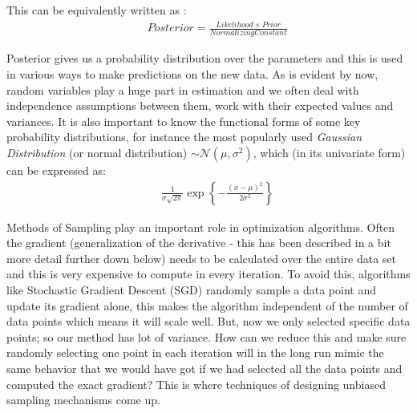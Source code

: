 \documentclass[a4paper]{article}
\begin{document}
\noindent This can be equivalently written as : \\
\begin{equation} \label{eq:3}
\begin{aligned}
& & Posterior = \frac{ Likelihood \times Prior}{Normalizing Constant}
\end{aligned}
\end{equation}

\noindent Posterior gives us a probability distribution over the parameters and this is used in various ways to make predictions on the new data. As is evident by now, random variables play a huge part in estimation and we often deal with independence assumptions between them, work with their expected values and variances. It is also important to know the functional forms of some key probability distributions, for instance the most popularly used {\it Gaussian Distribution} (or normal distribution) $\sim \mathcal{N} (\mu, \sigma^2)$, which (in its univariate form) can be expressed as: \\

\begin{equation} \label{eq:4}
\begin{aligned}
& & \frac{1}{\sigma \sqrt{2 \pi}} \exp \left\{ - \frac{(x-\mu)^2}{2 \sigma^2} \right\}
\end{aligned}
\end{equation}

\noindent Methods of Sampling play an important role in optimization algorithms. Often the gradient (generalization of the derivative - this has been described in a bit more detail further down below) needs to be calculated over the entire data set and this is very expensive to compute in every iteration. To avoid this, algorithms like Stochastic Gradient Descent (SGD) randomly sample a data point and update its gradient alone, this makes the algorithm independent of the number of data points which means it will scale well. But, now we only selected specific data points; so our method has lot of variance. How can we reduce this and make sure randomly selecting one point in each iteration will in the long run mimic the same behavior that we would have got if we had selected all the data points and computed the exact gradient? This is where techniques of designing unbiased sampling mechanisms come up. \\
\end{document}
